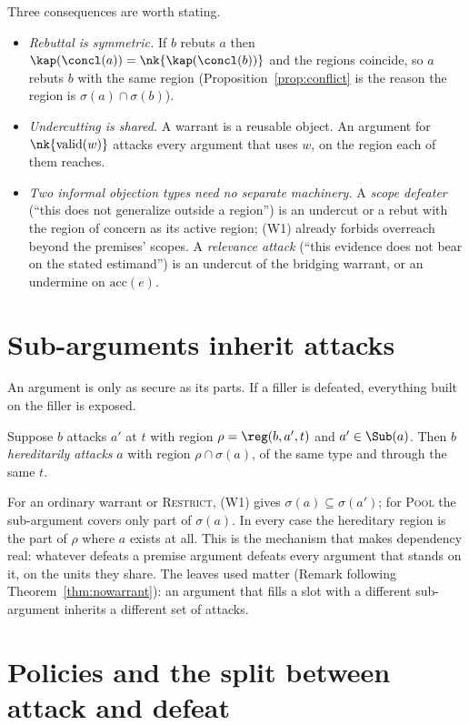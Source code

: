 Three consequences are worth stating.
\begin{itemize}
\item \emph{Rebuttal is symmetric.} If $b$ rebuts $a$ then $\kap(\concl(a))=\nk{\kap(\concl(b))}$ and the regions coincide, so $a$ rebuts $b$ with the same region (Proposition~\ref{prop:conflict} is the reason the region is $\sigma(a)\cap\sigma(b)$).
\item \emph{Undercutting is shared.} A warrant is a reusable object. An argument for $\nk{\mathrm{valid}(w)}$ attacks every argument that uses $w$, on the region each of them reaches.
\item \emph{Two informal objection types need no separate machinery.} A \emph{scope defeater} (``this does not generalize outside a region'') is an undercut or a rebut with the region of concern as its active region; (W1) already forbids overreach beyond the premises' scopes. A \emph{relevance attack} (``this evidence does not bear on the stated estimand'') is an undercut of the bridging warrant, or an undermine on $\mathrm{acc}(e)$.
\end{itemize}

\section{Sub-arguments inherit attacks}

An argument is only as secure as its parts. If a filler is defeated, everything built on the filler is exposed.

\begin{definition}\label{def:hereditary}
Suppose $b$ attacks $a'$ at $t$ with region $\rho=\reg(b,a',t)$ and $a'\in\Sub(a)$. Then $b$ \emph{hereditarily attacks} $a$ with region $\rho\cap\sigma(a)$, of the same type and through the same $t$.
\end{definition}

For an ordinary warrant or \textsc{Restrict}, (W1) gives $\sigma(a)\subseteq\sigma(a')$; for \textsc{Pool} the sub-argument covers only part of $\sigma(a)$. In every case the hereditary region is the part of $\rho$ where $a$ exists at all. This is the mechanism that makes dependency real: whatever defeats a premise argument defeats every argument that stands on it, on the units they share. The leaves used matter (Remark following Theorem~\ref{thm:nowarrant}): an argument that fills a slot with a different sub-argument inherits a different set of attacks.

\section{Policies and the split between attack and defeat}


